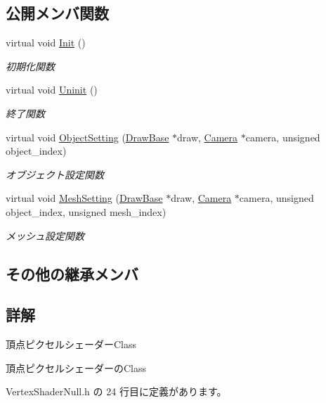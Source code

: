 \subsection*{公開メンバ関数}
\begin{DoxyCompactItemize}
\item 
virtual void \mbox{\hyperlink{class_vertex_shader_null_a4d79b358dab49c840345d74823a16840}{Init}} ()
\begin{DoxyCompactList}\small\item\em 初期化関数 \end{DoxyCompactList}\item 
virtual void \mbox{\hyperlink{class_vertex_shader_null_adf758f295d2803c6d8bd7e05e461abec}{Uninit}} ()
\begin{DoxyCompactList}\small\item\em 終了関数 \end{DoxyCompactList}\item 
virtual void \mbox{\hyperlink{class_vertex_shader_null_aae3231bb3fa5df2578ba89701867ffb3}{Object\+Setting}} (\mbox{\hyperlink{class_draw_base}{Draw\+Base}} $\ast$draw, \mbox{\hyperlink{class_camera}{Camera}} $\ast$camera, unsigned object\+\_\+index)
\begin{DoxyCompactList}\small\item\em オブジェクト設定関数 \end{DoxyCompactList}\item 
virtual void \mbox{\hyperlink{class_vertex_shader_null_a7bd853b15ab81cec44f1b6a1ea70a3a9}{Mesh\+Setting}} (\mbox{\hyperlink{class_draw_base}{Draw\+Base}} $\ast$draw, \mbox{\hyperlink{class_camera}{Camera}} $\ast$camera, unsigned object\+\_\+index, unsigned mesh\+\_\+index)
\begin{DoxyCompactList}\small\item\em メッシュ設定関数 \end{DoxyCompactList}\end{DoxyCompactItemize}
\subsection*{その他の継承メンバ}


\subsection{詳解}
頂点ピクセルシェーダー\+Class 

頂点ピクセルシェーダーの\+Class 

 Vertex\+Shader\+Null.\+h の 24 行目に定義があります。




